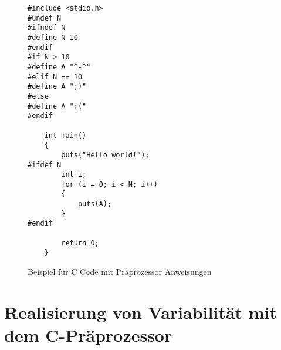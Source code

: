 
\lstset{escapechar=@,style=customc}
\begin{figure}[H]
\hspace*{3cm}
\begin{minipage}{\textwidth}
\begin{lstlisting}
#include <stdio.h>
#undef N
#ifndef N
#define N 10
#endif	
#if N > 10
#define A "^-^"
#elif N == 10
#define A ";)"
#else
#define A ":("
#endif
	
	int main()
	{
		puts("Hello world!");
#ifdef N
		int i;
		for (i = 0; i < N; i++)
		{
			puts(A);
		}
#endif
		
		return 0;
	}
\end{lstlisting}
\end{minipage}
%
\caption{Beispiel für C Code mit Präprozessor Anweisungen}
\end{figure}


\section{Realisierung von Variabilität mit dem C-Präprozessor}

